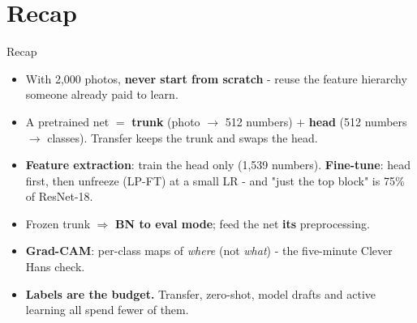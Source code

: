 \documentclass[aspectratio=169]{beamer}
\begin{document}
\section*{Recap}

\begin{frame}{Recap}
  \begin{itemize}
    \item With 2,000 photos, \textbf{never start from scratch} - reuse the feature
      hierarchy someone already paid to learn.
    \item A pretrained net $=$ \textbf{trunk} (photo $\to$ 512 numbers) $+$ \textbf{head}
      (512 numbers $\to$ classes). Transfer keeps the trunk and swaps the head.
    \item \textbf{Feature extraction}: train the head only (1,539 numbers).
      \textbf{Fine-tune}: head first, then unfreeze (LP-FT) at a small LR - and "just the top
      block" is 75\% of ResNet-18.
    \item Frozen trunk $\Rightarrow$ \textbf{BN to eval mode}; feed the net \textbf{its}
      preprocessing.
    \item \textbf{Grad-CAM}: per-class maps of \emph{where} (not \emph{what}) - the
      five-minute Clever Hans check.
    \item \textbf{Labels are the budget.} Transfer, zero-shot, model drafts and active
      learning all spend fewer of them.
  \end{itemize}
  \vskip 4pt
\end{frame}
\end{document}
